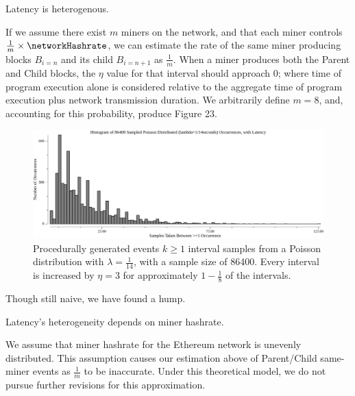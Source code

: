 \documentclass[11pt]{article}
\begin{document}
	\vspace{5mm}
	\begin{proposition}
		Latency is heterogenous.
	\end{proposition}

	If we assume there exist $m$ miners on the network, and that each miner
	controls $\frac{1}{m} \times \networkHashrate$, we can estimate the rate of the
	same miner producing blocks $B_{i=n}$ and its child $B_{i=n+1}$ as
	$\frac{1}{m}$.
	When a miner produces both the Parent and Child blocks, the $\eta$ value for
	that interval should approach $0$; where time of program execution alone is
	considered relative to the aggregate time of program execution plus network
	transmission duration.
	We arbitrarily define $m=8$, and, accounting for this probability, produce
	Figure 23.

	\begin{figure}[tph]
		\centering

		\includegraphics[width=1.0\textwidth]{go-block-step/out/vis_poisson_samples_eventintervals_latencysamesame_hist.png}
		\caption{
			Procedurally generated events $k \geq 1$ interval samples from a Poisson distribution
			with $\lambda = \frac{1}{14}$, with a sample size of 86400.
			Every interval is increased by $\eta=3$ for approximately
			$1-\frac{1}{8}$ of the intervals.
		}
	\end{figure}

	Though still naive, we have found a hump.

	\vspace{5mm}
	\begin{proposition}
		Latency's heterogeneity depends on miner hashrate. %
	\end{proposition}

	We assume that miner hashrate for the Ethereum network is unevenly distributed.
	This assumption causes our estimation above of Parent/Child same-miner events
	as $\frac{1}{m}$ to be inaccurate.
	Under this theoretical model, we do not pursue further revisions for this
	approximation.
\end{document}
